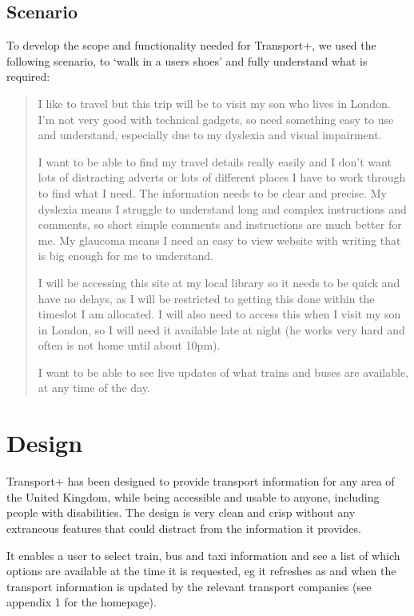 \documentclass{ueacmpstyle}
\newenvironment{quoted}{\begin{quotation}\it}{\end{quotation}}
\begin{document}
\subsection{Scenario}
To develop the scope and functionality needed for Transport+, we used the following scenario, to `walk in a users shoes' and fully understand what is required:

\begin{quoted}

I like to travel but this trip will be to visit my son who lives in London. I'm not very good with technical gadgets, so need something easy to use and understand, especially due to my dyslexia and visual impairment.
 
I want to be able to find my travel details really easily and I don't want lots of distracting adverts or lots of different places I have to work through to find what I need. The information needs to be clear and precise. My dyslexia means I struggle to understand long and complex instructions and comments, so short simple comments and instructions are much better for me. 
My glaucoma means I need an easy to view website with writing that is big enough for me to understand.

I will be accessing this site at my local library so it needs to be quick and have no delays, as I will be restricted to getting this done within the timeslot I am allocated. 
I will also need to access this when I visit my son in London, so I will need it available late at night (he works very hard and often is not home until about 10pm).	

I want to be able to see live updates of what trains and buses are available, at any time of the day.
\end{quoted}


\section{Design}
Transport+ has been designed to provide transport information for any area of the United Kingdom, while being accessible and usable to anyone, including people with disabilities. The design is very clean and crisp without any extraneous features that could distract from the information it provides. 

It enables a user to select train, bus and taxi information and see a list of which options are available at the time it is requested, eg it refreshes as and when the transport information is updated by the relevant transport companies (see appendix 1 for the homepage).
\end{document}
